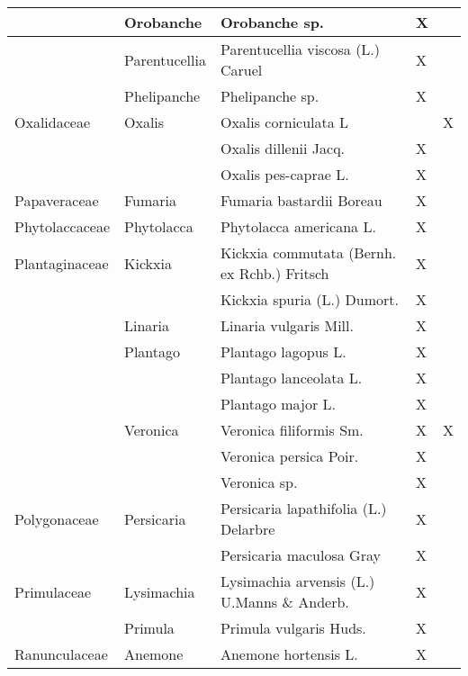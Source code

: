 \documentclass[main.tex]{subfiles}
\begin{document}
    \clearpage
        
        \begin{table}[!ht]
        \centering
    \begin{tabular}[\footnotesize]{|p{2.4cm}|p{1.9cm}|p{5.8cm}|p{1.1cm}|p{1cm}|}
    \hline
        ~ & Orobanche & Orobanche sp. & X & ~ \\ \hline
        ~ & Parentucellia & Parentucellia viscosa (L.) Caruel & X & ~ \\ \hline
        ~ & Phelipanche & Phelipanche sp. & X & ~ \\ \hline
        Oxalidaceae & Oxalis & Oxalis corniculata L & ~ & X \\ \hline
        ~ & ~ & Oxalis dillenii Jacq. & X & ~ \\ \hline
        ~ & ~ & Oxalis pes-caprae L. & X & ~ \\ \hline
        Papaveraceae & Fumaria & Fumaria bastardii Boreau & X & ~ \\ \hline
        Phytolaccaceae & Phytolacca & Phytolacca americana L. & X & ~ \\ \hline
        Plantaginaceae & Kickxia & Kickxia commutata (Bernh. ex Rchb.) Fritsch & X & ~ \\ \hline
        ~ & ~ & Kickxia spuria (L.) Dumort. & X & ~ \\ \hline
        ~ & Linaria & Linaria vulgaris Mill. & X & ~ \\ \hline
        ~ & Plantago & Plantago lagopus L. & X & ~ \\ \hline
        ~ & ~ & Plantago lanceolata L. & X & ~ \\ \hline
        ~ & ~ & Plantago major L. & X & ~ \\ \hline
        ~ & Veronica & Veronica filiformis Sm. & X & X \\ \hline
        ~ & ~ & Veronica persica Poir. & X & ~ \\ \hline
        ~ & ~ & Veronica sp. & X & ~ \\ \hline
        Polygonaceae & Persicaria & Persicaria lapathifolia (L.) Delarbre & X & ~ \\ \hline
        ~ & ~ & Persicaria maculosa Gray & X & ~ \\ \hline
        Primulaceae & Lysimachia & Lysimachia arvensis (L.) U.Manns \& Anderb. & X & ~ \\ \hline
        ~ & Primula & Primula vulgaris Huds. & X & ~ \\ \hline
        Ranunculaceae & Anemone & Anemone hortensis L. & X & ~ \\ \hline

\end{tabular}
\end{table}
\end{document}
